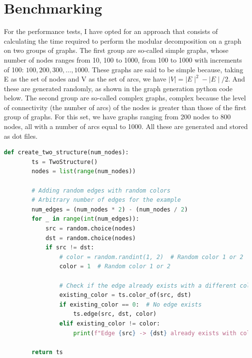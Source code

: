 

\chapter{Benchmarking}\label{ch:benchmarking}

For the performance tests, I have opted for an approach that consists of calculating the time required to perform the modular decomposition on a graph on two groups of graphs.
The first group are so-called simple graphs, whose number of nodes ranges from 10, 100 to 1000, from 100 to 1000 with increments of 100: $100, 200, 300, \dots, 1000$.
These graphs are said to be simple because, taking E as the set of nodes and V as the set of arcs, we have $\mid V \mid = \mid E \mid ^2 - \mid E \mid /2$.
And these are generated randomly, as shown in the graph generation python code below.
The second group are so-called complex graphs, complex because the level of connectivity (the number of arcs) of the nodes is greater than those of the first group of graphs.
For this set, we have graphs ranging from 200 nodes to 800 nodes, all with a number of arcs equal to 1000.
All these are generated and stored as dot files.

\begin{lstlisting}[language=Python, style=python, caption={Simple graph generation function}, label={lst:simple-graph-generation-function}, firstnumber=1]
    def create_two_structure(num_nodes):
        ts = TwoStructure()
        nodes = list(range(num_nodes))

        # Adding random edges with random colors
        # Arbitrary number of edges for the example
        num_edges = (num_nodes * 2) - (num_nodes / 2)
        for _ in range(int(num_edges)):
            src = random.choice(nodes)
            dst = random.choice(nodes)
            if src != dst:
                # color = random.randint(1, 2)  # Random color 1 or 2
                color = 1  # Random color 1 or 2

                # Check if the edge already exists with a different color
                existing_color = ts.color_of(src, dst)
                if existing_color == 0:  # No edge exists
                    ts.edge(src, dst, color)
                elif existing_color != color:
                    print(f"Edge {src} -> {dst} already exists with color {existing_color}, skipping...")

        return ts
\end{lstlisting}

